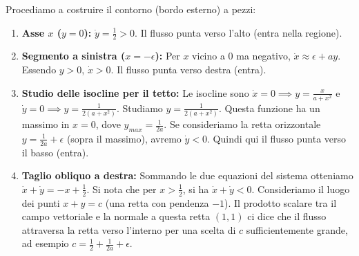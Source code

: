 \documentclass[openany]{book}
\theoremstyle{definition}
\theoremstyle{remark}
\begin{document}
Procediamo a costruire il contorno (bordo esterno) a pezzi:
\begin{enumerate}
    \item \textbf{Asse $x$ ($y=0$):} $\dot{y} = \frac{1}{2} > 0$. Il flusso punta verso l'alto (entra nella regione).
    \item \textbf{Segmento a sinistra ($x=-\epsilon$):} Per $x$ vicino a $0$ ma negativo, $\dot{x} \approx \epsilon + ay$. Essendo $y>0$, $\dot{x} > 0$. Il flusso punta verso destra (entra).
    \item \textbf{Studio delle isocline per il tetto:}
    Le isocline sono $\dot{x}=0 \implies y = \frac{x}{a+x^2}$ e $\dot{y}=0 \implies y = \frac{1}{2(a+x^2)}$.
    Studiamo $y = \frac{1}{2(a+x^2)}$. Questa funzione ha un massimo in $x=0$, dove $y_{max} = \frac{1}{2a}$.
    Se consideriamo la retta orizzontale \textbf{$y = \frac{1}{2a} + \epsilon$} (sopra il massimo), avremo $\dot{y} < 0$. Quindi qui il flusso punta verso il basso (entra).
    \item \textbf{Taglio obliquo a destra:}
    Sommando le due equazioni del sistema otteniamo $\dot{x} + \dot{y} = -x + \frac{1}{2}$. 
    Si nota che per $x > \frac{1}{2}$, si ha $\dot{x} + \dot{y} < 0$. 
    Consideriamo il luogo dei punti $x+y = c$ (una retta con pendenza $-1$). Il prodotto scalare tra il campo vettoriale e la normale a questa retta $(1,1)$ ci dice che il flusso attraversa la retta verso l'interno per una scelta di $c$ sufficientemente grande, ad esempio $c = \frac{1}{2} + \frac{1}{2a} + \epsilon$.
\end{enumerate}
\end{document}
